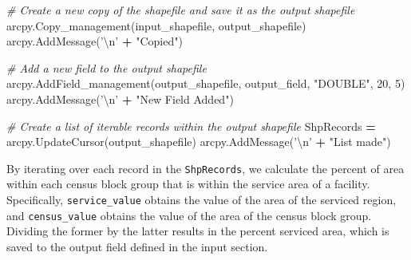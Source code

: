\documentclass[11pt,]{article}
\newenvironment{Shaded}{\begin{snugshade}}{\end{snugshade}}
\newcommand{\DecValTok}[1]{\textcolor[rgb]{0.00,0.00,0.81}{{#1}}}
\newcommand{\CharTok}[1]{\textcolor[rgb]{0.31,0.60,0.02}{{#1}}}
\newcommand{\StringTok}[1]{\textcolor[rgb]{0.31,0.60,0.02}{{#1}}}
\newcommand{\CommentTok}[1]{\textcolor[rgb]{0.56,0.35,0.01}{\textit{{#1}}}}
\newcommand{\OperatorTok}[1]{\textcolor[rgb]{0.81,0.36,0.00}{\textbf{{#1}}}}
\newcommand{\NormalTok}[1]{{#1}}
\begin{document}
\begin{Shaded}
\begin{Highlighting}[]

    \CommentTok{# Create a new copy of the shapefile and save it as the output shapefile}
    \NormalTok{arcpy.Copy_management(input_shapefile, output_shapefile)}
    \NormalTok{arcpy.AddMessage(}\StringTok{'}\CharTok{\textbackslash{}n}\StringTok{'} \OperatorTok{+} \StringTok{"Copied"}\NormalTok{)}

    \CommentTok{# Add a new field to the output shapefile}
    \NormalTok{arcpy.AddField_management(output_shapefile, output_field, }\StringTok{"DOUBLE"}\NormalTok{, }\DecValTok{20}\NormalTok{, }\DecValTok{5}\NormalTok{)}
    \NormalTok{arcpy.AddMessage(}\StringTok{'}\CharTok{\textbackslash{}n}\StringTok{'} \OperatorTok{+} \StringTok{"New Field Added"}\NormalTok{)}

    \CommentTok{# Create a list of iterable records within the output shapefile}
    \NormalTok{ShpRecords }\OperatorTok{=} \NormalTok{arcpy.UpdateCursor(output_shapefile)}
    \NormalTok{arcpy.AddMessage(}\StringTok{'}\CharTok{\textbackslash{}n}\StringTok{'} \OperatorTok{+} \StringTok{"List made"}\NormalTok{)}
\end{Highlighting}
\end{Shaded}

\noindent By iterating over each record in the \texttt{ShpRecords}, we
calculate the percent of area within each census block group that is
within the service area of a facility. Specifically,
\texttt{service\_value} obtains the value of the area of the serviced
region, and \texttt{census\_value} obtains the value of the area of the
census block group. Dividing the former by the latter results in the
percent serviced area, which is saved to the output field defined in the
input section.
\end{document}
